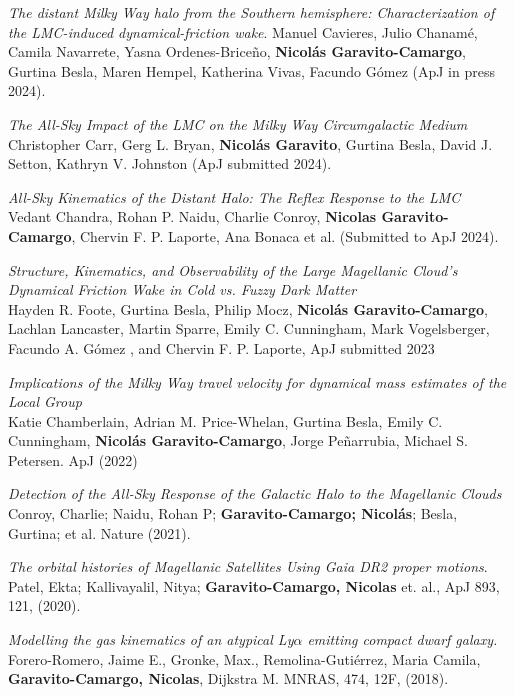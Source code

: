 \documentclass[14pt]{article}
\begin{document}
\begin{etaremune}
  \setcounter{enumi}{23}
  
  \item \textit{The distant Milky Way halo from the Southern hemisphere:
    Characterization of the LMC-induced dynamical-friction wake}. Manuel
    Cavieres, Julio Chanam\'e, Camila Navarrete, Yasna Ordenes-Brice\~no,
    \textbf{Nicol\'as Garavito-Camargo}, Gurtina Besla, Maren Hempel, Katherina Vivas, Facundo
    G\'omez (ApJ in press 2024).

  \item \textit{The All-Sky Impact of the LMC on the Milky Way Circumgalactic
  Medium}\\ Christopher Carr, Gerg L. Bryan, \textbf{Nicol\'as Garavito}, Gurtina Besla,
  David J. Setton, Kathryn V. Johnston (ApJ submitted 2024).

\item \textit{All-Sky Kinematics of the Distant Halo: The Reflex Response to the
  LMC}\\ Vedant Chandra, Rohan P. Naidu, Charlie Conroy, \textbf{Nicolas
  Garavito-Camargo}, Chervin F. P. Laporte, Ana Bonaca et al. (Submitted to ApJ 2024).


\item \textit{Structure, Kinematics, and Observability of the Large Magellanic
  Cloud's Dynamical Friction Wake in Cold vs. Fuzzy Dark Matter}\\
 Hayden R. Foote, Gurtina Besla, Philip Mocz, \textbf{Nicol\'as
 Garavito-Camargo},
 Lachlan Lancaster, Martin Sparre, Emily C. Cunningham, Mark Vogelsberger, Facundo A. Gómez , and Chervin F. P. Laporte, ApJ submitted 2023\\


\item \textit{Implications of the Milky Way travel velocity for dynamical mass
  estimates of the Local Group}\\
  Katie Chamberlain, Adrian M. Price-Whelan, Gurtina Besla, Emily C. Cunningham, \textbf{Nicol\'as Garavito-Camargo}, Jorge Peñarrubia, Michael S. Petersen. ApJ (2022)\\  


\item \textit{Detection of the All-Sky Response of the Galactic
  Halo to the Magellanic Clouds}\\ 
  Conroy, Charlie; Naidu, Rohan P; \textbf{Garavito-Camargo; Nicol\'as}; Besla,
  Gurtina; et al. Nature (2021). 


\item \textit{The orbital histories of Magellanic Satellites Using Gaia DR2
  proper motions}. \\
  Patel, Ekta; Kallivayalil, Nitya; \textbf{Garavito-Camargo, Nicolas} et. al.,
  ApJ 893, 121, (2020).


\item \textit{Modelling the gas kinematics of an atypical Ly$\alpha$
emitting compact dwarf galaxy.}\\  Forero-Romero, Jaime E., Gronke, Max.,
Remolina-Gutiérrez, Maria Camila, \textbf{Garavito-Camargo, Nicolas}, Dijkstra
M. MNRAS, 474, 12F, (2018).

\end{etaremune}
\end{document}
